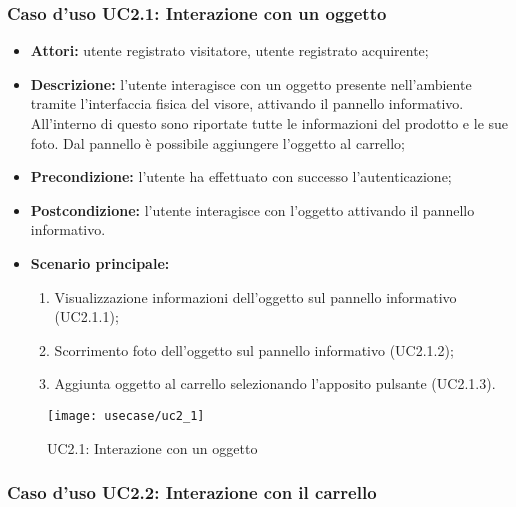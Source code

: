 \subsubsection{Caso d'uso UC2.1: Interazione con un oggetto}

\begin{itemize}
	\item \textbf{Attori:} utente registrato visitatore, utente registrato acquirente;
	\item \textbf{Descrizione:} l'utente interagisce con un oggetto presente nell'ambiente tramite l'interfaccia fisica del visore, attivando il pannello informativo. All'interno di questo sono riportate tutte le informazioni del prodotto e le sue foto. Dal pannello è possibile aggiungere l'oggetto al carrello;
	\item \textbf{Precondizione:} l'utente ha effettuato con successo l'autenticazione;
	\item \textbf{Postcondizione:} l'utente interagisce con l'oggetto attivando il pannello informativo.
	\item \textbf{Scenario principale:}
	\begin{enumerate}
		\item Visualizzazione informazioni dell'oggetto sul pannello informativo (UC2.1.1);
		\item Scorrimento foto dell'oggetto sul pannello informativo (UC2.1.2);
		\item Aggiunta oggetto al carrello selezionando l'apposito pulsante (UC2.1.3).
	\end{enumerate}
\end{itemize}

\label{UC2.1}
\begin{figure}[ht]
	\begin{center}
		\texttt{[image: usecase/uc2\_1]}
		\caption{UC2.1: Interazione con un oggetto}
	\end{center}
\end{figure}
\FloatBarrier

\subsubsection{Caso d'uso UC2.2: Interazione con il carrello}

